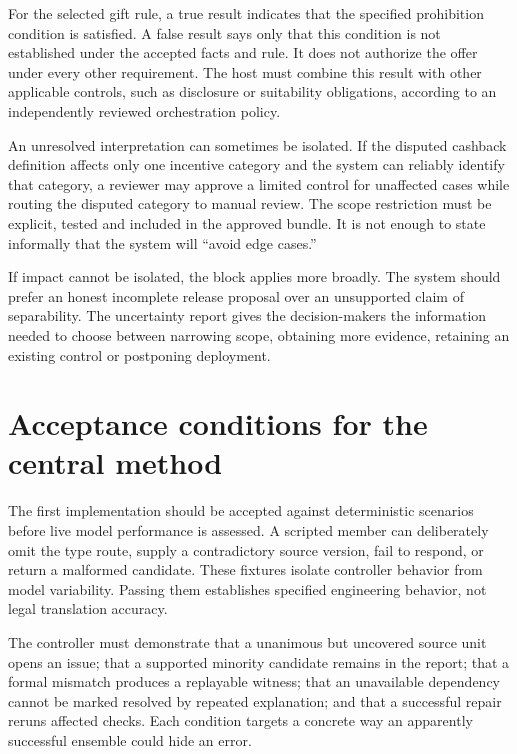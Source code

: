 \documentclass[12pt,a4paper,oneside,openany]{book}
\begin{document}
For the selected gift rule, a true result indicates that the specified
prohibition condition is satisfied. A false result says only that this condition
is not established under the accepted facts and rule. It does not authorize the
offer under every other requirement. The host must combine this result with other
applicable controls, such as disclosure or suitability obligations, according to
an independently reviewed orchestration policy.

An unresolved interpretation can sometimes be isolated. If the disputed cashback
definition affects only one incentive category and the system can reliably
identify that category, a reviewer may approve a limited control for unaffected
cases while routing the disputed category to manual review. The scope restriction
must be explicit, tested and included in the approved bundle. It is not enough to
state informally that the system will ``avoid edge cases.''

If impact cannot be isolated, the block applies more broadly. The system should
prefer an honest incomplete release proposal over an unsupported claim of
separability. The uncertainty report gives the decision-makers the information
needed to choose between narrowing scope, obtaining more evidence, retaining an
existing control or postponing deployment.

\section{Acceptance conditions for the central method}
\label{merge:M06:25}


The first implementation should be accepted against deterministic scenarios
before live model performance is assessed. A scripted member can deliberately
omit the type route, supply a contradictory source version, fail to respond, or
return a malformed candidate. These fixtures isolate controller behavior from
model variability. Passing them establishes specified engineering behavior, not
legal translation accuracy.

The controller must demonstrate that a unanimous but uncovered source unit opens
an issue; that a supported minority candidate remains in the report; that a
formal mismatch produces a replayable witness; that an unavailable dependency
cannot be marked resolved by repeated explanation; and that a successful repair
reruns affected checks. Each condition targets a concrete way an apparently
successful ensemble could hide an error.
\end{document}
